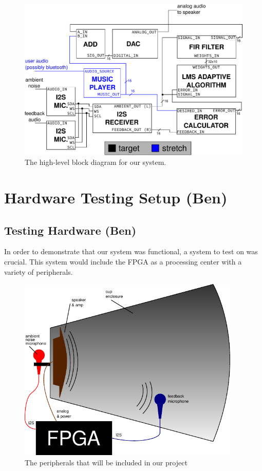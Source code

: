 \documentclass{fpgairpods}
\begin{document}
\begin{figure}
\includegraphics[width=\textwidth]{./figs/block_diagram.pdf}
\caption{The high-level block diagram for our system.}
\label{fig:blockdiagram}
\end{figure}


\newpage
\section{Hardware Testing Setup (Ben)}
\subsection{Testing Hardware (Ben)}
In order to demonstrate that our system was functional, a system to test on was crucial. This system would include the FPGA as a processing center with a variety of peripherals.

\begin{figure}[h]
\centering
\includegraphics[width=300pt]{./figs/system_diagram_with_text.pdf}
\caption{The peripherals that will be included in our project}
\label{fig:peripherals}
\end{figure}
\end{document}
